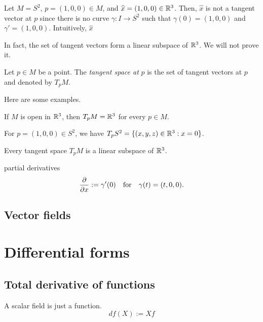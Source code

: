 \documentclass{../exp}
\begin{document}
\begin{ex}
Let $M=S^2$, $p=(1,0,0)\in M$, and $\widehat x=(1,0,0)\in\mathbb{R}^3$.
Then, $\hat x$ is not a tangent vector at $p$ since there is no curve $\gamma:I\to S^2$ such that $\gamma(0)=(1,0,0)$ and $\gamma'=(1,0,0)$.
Intuitively, $\hat x$ 
\end{ex}

In fact, the set of tangent vectors form a linear subspace of $\mathbb{R}^3$.
We will not prove it.

\begin{defn}
Let $p\in M$ be a point.
The \emph{tangent space at} $p$ is the set of tangent vectors at $p$ and denoted by $T_pM$.
\end{defn}
Here are some examples.
\begin{ex}
If $M$ is open in $\mathbb{R}^3$, then $T_pM=\mathbb{R}^3$ for every $p\in M$.
\end{ex}
\begin{ex}
For $p=(1,0,0)\in S^2$, we have $T_pS^2=\{(x,y,z)\in\mathbb{R}^3:x=0\}$.
\end{ex}
\begin{prop}
Every tangent space $T_pM$ is a linear subspace of $\mathbb{R}^3$.
\end{prop}




partial derivatives
\[\pd{x}:=\gamma'(0)\quad\text{for}\quad \gamma(t)=(t,0,0).\]

\subsection{Vector fields}























\section{Differential forms}
\subsection{Total derivative of functions}
A scalar field is just a function.
\[df(X):=Xf\]
\end{document}
